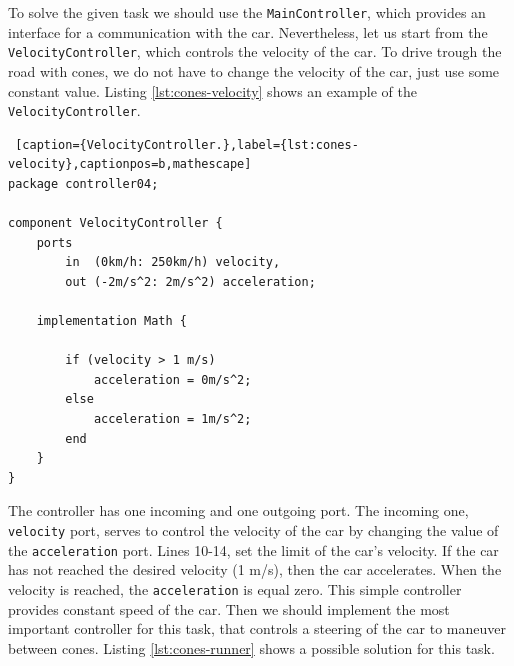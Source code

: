 To solve the given task we should use the \texttt{MainController}, which provides an interface for a communication with the car. Nevertheless, let us start from the \texttt{VelocityController}, which controls the velocity of the car. To drive trough the road with cones, we do not have to change the velocity of the car, just use some constant value. Listing \ref{lst:cones-velocity} shows an example of the \texttt{VelocityController}.
\bigskip
\begin{lstlisting} [caption={VelocityController.},label={lst:cones-velocity},captionpos=b,mathescape]
package controller04;

component VelocityController {
    ports
        in  (0km/h: 250km/h) velocity,
        out (-2m/s^2: 2m/s^2) acceleration; 

    implementation Math {                    

        if (velocity > 1 m/s)
            acceleration = 0m/s^2;
        else
            acceleration = 1m/s^2;
        end
    }
}
\end{lstlisting}
\bigskip
The controller has one incoming and one outgoing port. The incoming one, \texttt{velocity} port, serves to control the velocity of the car by changing the value of the \texttt{acceleration} port. Lines 10-14, set the limit of the car's velocity. If the car has not reached the desired velocity (1 m/s), then the car accelerates. When the velocity is reached, the \texttt{acceleration} is equal zero. This simple controller provides constant speed of the car. Then we should implement the most important controller for this task, that controls a steering of the car to maneuver between cones. Listing \ref{lst:cones-runner} shows a possible solution for this task.\newline
\bigskip
